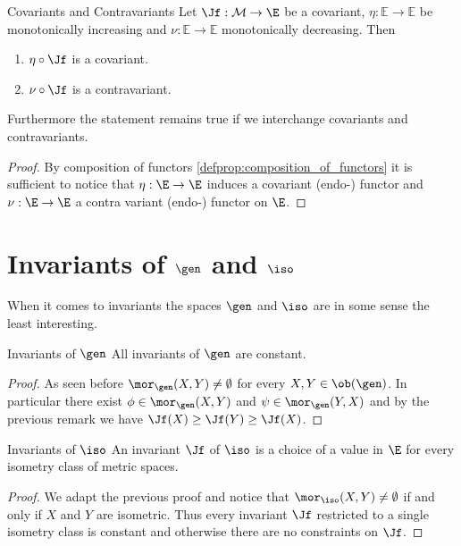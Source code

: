 \begin{proposition}{Covariants and Contravariants}{}
Let $\Jf: \mathcal{M} \to \E$ be a covariant, $\eta: \mathbb{E} \to \mathbb{E}$ be monotonically increasing
and $\nu: \mathbb{E} \to \mathbb{E}$ monotonically decreasing. Then
\begin{enumerate}
    \item $\eta \circ \Jf$ is a covariant.
    \item $\nu \circ \Jf$ is a contravariant.
\end{enumerate}
Furthermore the statement remains true if we interchange covariants and contravariants.
\end{proposition}

\begin{proof}
By composition of functors \ref{defprop:composition_of_functors} it is sufficient to notice that $\eta: \E \to \E$ induces a covariant (endo-) functor and $\nu: \E \to \E$ a contra variant (endo-) functor on $\E$.
\end{proof}


\section{Invariants of $\gen$ and $\iso$}
When it comes to invariants the spaces $\gen$ and $\iso$ are in some sense the least interesting.

\begin{proposition}{Invariants of $\gen$}{}
All invariants of $\gen$ are constant.
\end{proposition}
\begin{proof}
As seen before $\mor_\gen(X,Y) \neq \emptyset$ for every $X,Y \in \ob(\gen)$. In particular there exist $\phi \in \mor_\gen(X,Y)$ and $\psi \in \mor_\gen(Y,X)$ and by the previous remark we have $\Jf(X) \geq \Jf(Y) \geq \Jf(X)$.
\end{proof}

\begin{proposition}{Invariants of $\iso$}{}
An invariant $\Jf$ of $\iso$ is a choice of a value in $\E$ for every isometry class of metric spaces.
\end{proposition}

\begin{proof}
We adapt the previous proof and notice that $\mor_\iso(X,Y) \neq \emptyset$ if and only if $X$ and $Y$ are isometric. Thus every invariant $\Jf$ restricted to a single isometry class is constant and otherwise there are no constraints on $\Jf$.
\end{proof}

